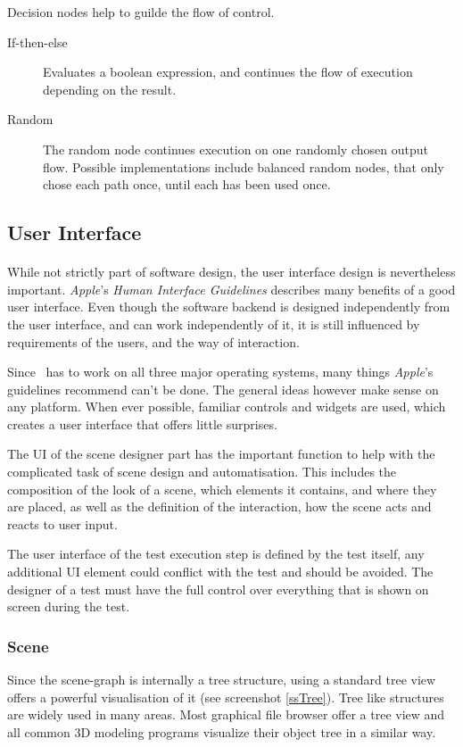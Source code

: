 Decision nodes help to guilde the flow of control.

\begin{description}
\item[If-then-else]
Evaluates a boolean expression, and continues the flow of execution depending on the result.

\item[Random]
The random node continues execution on one randomly chosen output flow.
Possible implementations include balanced random nodes, that only chose each path once, until each has been used once.

\end{description}


\subsection{User Interface}
\paragraph{}
While not strictly part of software design, the user interface design is nevertheless important. \textit{Apple}'s \textit{Human Interface Guidelines}\cite{hig} describes many benefits of a good user interface.
Even though the software backend is designed independently from the user interface, and can work independently of it, it is still influenced by requirements of the users, and the way of interaction.

Since \ER\ has to work on all three major operating systems, many things \textit{Apple}'s guidelines recommend can't be done.
The general ideas however make sense on any platform.
When ever possible, familiar controls and widgets are used, which creates a user interface that offers little surprises.

The UI of the scene designer part has the important function to help with the complicated task of scene design and automatisation.
This includes the composition of the look of a scene, which elements it contains, and where they are placed, as well as the definition of the interaction, how the scene acts and reacts to user input.

The user interface of the test execution step is defined by the test itself, any additional UI element could conflict with the test and should be avoided.
The designer of a test must have the full control over everything that is shown on screen during the test.


\subsubsection{Scene}
Since the scene-graph is internally a tree structure, using a standard tree view offers a powerful visualisation of it (see screenshot \ref{ssTree}).
Tree like structures are widely used in many areas.
Most graphical file browser offer a tree view and all common 3D modeling programs visualize their object tree in a similar way.

